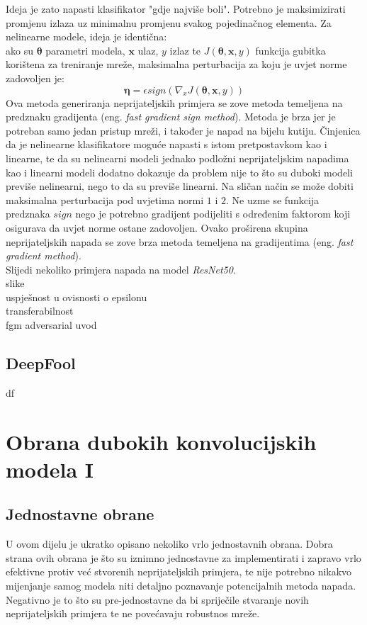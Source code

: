 \documentclass[utf8, diplomski]{fer}
\begin{document}
\par
Ideja je zato napasti klasifikator "gdje najviše boli". Potrebno je maksimizirati promjenu izlaza uz minimalnu promjenu svakog pojedinačnog elementa. Za nelinearne modele, ideja je identična: \\
ako su $\boldsymbol{\theta}$ parametri modela, $\boldsymbol{x}$ ulaz, $y$ izlaz te $J(\boldsymbol{\theta}, \boldsymbol{x}, y)$ funkcija gubitka korištena za treniranje mreže, maksimalna perturbacija za koju je uvjet norme zadovoljen je:
\begin{equation}
	\boldsymbol{\eta} = \epsilon sign(\nabla_{x}J(\boldsymbol{\theta}, \boldsymbol{x}, y))
\end{equation}
Ova metoda generiranja neprijateljskih primjera se zove metoda temeljena na predznaku gradijenta (eng. \textit{fast gradient sign method}). Metoda je brza jer je potreban samo jedan pristup mreži, i također je napad na bijelu kutiju.
Činjenica da je nelinearne klasifikatore moguće napasti s istom pretpostavkom kao i linearne, te da su nelinearni modeli jednako podložni neprijateljskim napadima kao i linearni modeli dodatno dokazuje da problem nije to što su duboki modeli previše nelinearni, nego to da su previše linearni. Na sličan način se može dobiti maksimalna perturbacija pod uvjetima normi $1$ i $2$. Ne uzme se funkcija predznaka $sign$ nego je potrebno gradijent podijeliti s određenim faktorom koji osigurava da uvjet norme ostane zadovoljen. Ovako proširena skupina neprijateljskih napada se zove brza metoda temeljena na gradijentima (eng. \textit{fast gradient method}). \\
Slijedi nekoliko primjera napada na model \textit{ResNet50}. \\
slike \\
uspješnost u ovisnosti o epsilonu \\
transferabilnost \\
fgm adversarial uvod 
\section{DeepFool} df\citep{MoosaviDezfooli2016DeepFoolAS}


\chapter{Obrana dubokih konvolucijskih modela I}
\section{Jednostavne obrane}
U ovom dijelu je ukratko opisano nekoliko vrlo jednostavnih obrana. Dobra strana ovih obrana je što su iznimno jednostavne za implementirati i zapravo vrlo efektivne protiv već stvorenih neprijateljskih primjera, te nije potrebno nikakvo mijenjanje samog modela niti detaljno poznavanje potencijalnih metoda napada. Negativno je to što su pre-jednostavne da bi spriječile stvaranje novih neprijateljskih primjera te ne povećavaju robustnos mreže.
\end{document}
